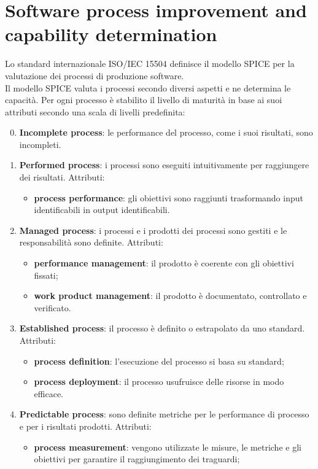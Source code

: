 \section{Software process improvement and capability determination}\label{app:spice}
Lo standard internazionale ISO/IEC 15504 definisce il modello SPICE per la valutazione dei processi di produzione software.\\
Il modello SPICE valuta i processi secondo diversi aspetti e ne determina le capacità.
Per ogni processo è stabilito il livello di maturità in base ai suoi attributi secondo una scala di livelli predefinita:
\begin{enumerate}
	\setcounter{enumi}{-1}
	\item \textbf{Incomplete process}: le performance del processo, come i suoi risultati, sono incompleti.
	\item \textbf{Performed process}: i processi sono eseguiti intuitivamente per raggiungere dei risultati. Attributi: 
		\begin{itemize}
			\item \textbf{process performance}: gli obiettivi sono raggiunti trasformando input identificabili in output identificabili.
		\end{itemize}
	\item \textbf{Managed process}: i processi e i prodotti dei processi sono gestiti e le responsabilità sono definite. Attributi:
		\begin{itemize}
			\item \textbf{performance management}: il prodotto è coerente con gli obiettivi fissati;
			\item \textbf{work product management}: il prodotto è documentato, controllato e verificato. 
		\end{itemize}
	\item \textbf{Established process}: il processo è definito o estrapolato da uno standard. Attributi:
		\begin{itemize}
			\item \textbf{process definition}: l'esecuzione del processo si basa su standard;
			\item \textbf{process deployment}: il processo usufruisce delle risorse in modo efficace.
		\end{itemize}
	\item \textbf{Predictable process}: sono definite metriche per le performance di processo e per i risultati prodotti. Attributi:
		\begin{itemize}
			\item \textbf{process measurement}: vengono utilizzate le misure, le metriche e gli obiettivi per garantire il raggiungimento dei traguardi;

\end{itemize}
\end{enumerate}
